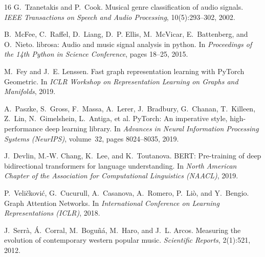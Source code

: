 \documentclass{article}
\begin{document}
\begin{thebibliography}{16}
G.~Tzanetakis and P.~Cook.
\newblock Musical genre classification of audio signals.
\newblock \emph{IEEE Transactions on Speech and Audio Processing}, 10(5):293--302, 2002.

B.~McFee, C.~Raffel, D.~Liang, D.~P. Ellis, M.~McVicar, E.~Battenberg, and O.~Nieto.
\newblock librosa: Audio and music signal analysis in python.
\newblock In \emph{Proceedings of the 14th Python in Science Conference}, pages 18--25, 2015.

M.~Fey and J.~E. Lenssen.
\newblock Fast graph representation learning with PyTorch Geometric.
\newblock In \emph{ICLR Workshop on Representation Learning on Graphs and Manifolds}, 2019.

A.~Paszke, S.~Gross, F.~Massa, A.~Lerer, J.~Bradbury, G.~Chanan, T.~Killeen, Z.~Lin, N.~Gimelshein, L.~Antiga, et al.
\newblock PyTorch: An imperative style, high-performance deep learning library.
\newblock In \emph{Advances in Neural Information Processing Systems (NeurIPS)}, volume~32, pages 8024--8035, 2019.

J.~Devlin, M.-W. Chang, K.~Lee, and K.~Toutanova.
\newblock BERT: Pre-training of deep bidirectional transformers for language understanding.
\newblock In \emph{North American Chapter of the Association for Computational Linguistics (NAACL)}, 2019.

P.~Veli{\v{c}}kovi{\'{c}}, G.~Cucurull, A.~Casanova, A.~Romero, P.~Li{\`{o}}, and Y.~Bengio.
\newblock Graph Attention Networks.
\newblock In \emph{International Conference on Learning Representations (ICLR)}, 2018.

J.~Serr{\`a}, {\'A}.~Corral, M.~Bogu{\~n}{\'a}, M.~Haro, and J.~L. Arcos.
\newblock Measuring the evolution of contemporary western popular music.
\newblock \emph{Scientific Reports}, 2(1):521, 2012.
\end{thebibliography}
\end{document}
